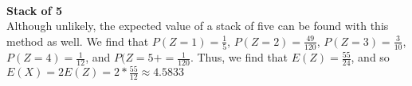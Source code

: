 \documentclass{article}
\begin{document}
\\\textbf{Stack of 5}
\\ Although unlikely, the expected value of a stack of five can be found with this method as well. We find that $P(Z=1) = \frac{1}{5}$, $P(Z=2) = \frac{49}{120}$, $P(Z=3) = \frac{3}{10}$, $P(Z=4) = \frac{1}{12}$, and $P(Z=5+ = \frac{1}{120}$. Thus, we find that $E(Z) = \frac{55}{24}$, and so $E(X) = 2E(Z) = 2*\frac{55}{12} \approx 4.5833$
\end{document}
